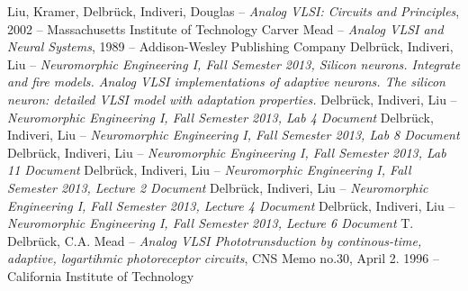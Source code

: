 \newpage
\begin{thebibliography}{7}
Liu, Kramer, Delbrück, Indiveri, Douglas -- \emph{Analog VLSI: Circuits and Principles}, 2002 -- Massachusetts Institute of Technology
Carver Mead -- \emph{Analog VLSI and Neural Systems}, 1989 -- Addison-Wesley Publishing Company
Delbrück, Indiveri, Liu -- \emph{Neuromorphic Engineering I, Fall Semester 2013, Silicon neurons. Integrate and fire models. Analog VLSI implementations of adaptive neurons. The silicon neuron: detailed VLSI model with adaptation properties. }
Delbrück, Indiveri, Liu -- \emph{Neuromorphic Engineering I, Fall Semester 2013, Lab 4 Document}
Delbrück, Indiveri, Liu -- \emph{Neuromorphic Engineering I, Fall Semester 2013, Lab 8 Document}
Delbrück, Indiveri, Liu -- \emph{Neuromorphic Engineering I, Fall Semester 2013, Lab 11 Document}
Delbrück, Indiveri, Liu -- \emph{Neuromorphic Engineering I, Fall Semester 2013, Lecture 2 Document}
Delbrück, Indiveri, Liu -- \emph{Neuromorphic Engineering I, Fall Semester 2013, Lecture 4 Document}
Delbrück, Indiveri, Liu -- \emph{Neuromorphic Engineering I, Fall Semester 2013, Lecture 6 Document}
T. Delbrück, C.A. Mead -- \emph{Analog VLSI Phototrunsduction by continous-time, adaptive, logartihmic photoreceptor circuits}, CNS Memo no.30, April 2. 1996 -- California Institute of Technology
\end{thebibliography}